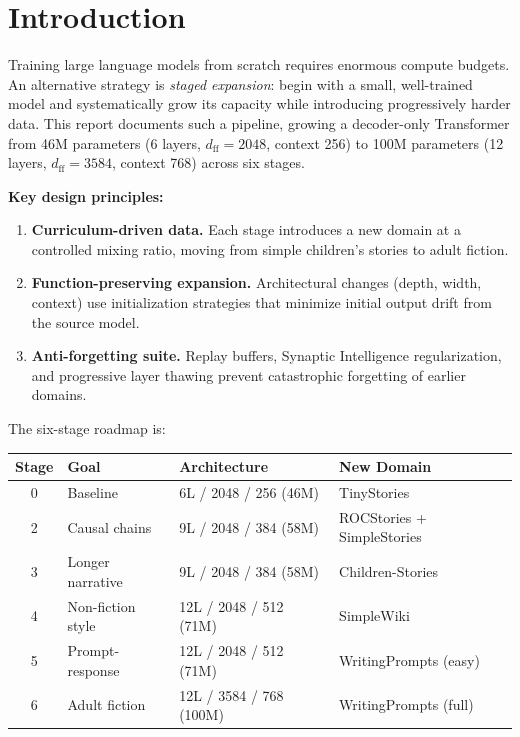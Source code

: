 \section{Introduction}

Training large language models from scratch requires enormous compute budgets.
An alternative strategy is \emph{staged expansion}: begin with a small,
well-trained model and systematically grow its capacity while introducing
progressively harder data.  This report documents such a pipeline, growing a
decoder-only Transformer from 46M parameters (6 layers, $d_\text{ff}=2048$,
context 256) to 100M parameters (12 layers, $d_\text{ff}=3584$, context 768)
across six stages.

\textbf{Key design principles:}
\begin{enumerate}[nosep]
  \item \textbf{Curriculum-driven data.}  Each stage introduces a new domain
        at a controlled mixing ratio, moving from simple children's stories to
        adult fiction.
  \item \textbf{Function-preserving expansion.}  Architectural changes
        (depth, width, context) use initialization strategies that minimize
        initial output drift from the source model.
  \item \textbf{Anti-forgetting suite.}  Replay buffers, Synaptic Intelligence
        regularization, and progressive layer thawing prevent catastrophic
        forgetting of earlier domains.
\end{enumerate}

The six-stage roadmap is:
\begin{center}
\small
\begin{tabular}{clll}
\toprule
\textbf{Stage} & \textbf{Goal} & \textbf{Architecture} & \textbf{New Domain} \\
\midrule
0 & Baseline          & 6L / 2048 / 256 (46M)   & TinyStories \\
2 & Causal chains     & 9L / 2048 / 384 (58M)   & ROCStories + SimpleStories \\
3 & Longer narrative  & 9L / 2048 / 384 (58M)   & Children-Stories \\
4 & Non-fiction style & 12L / 2048 / 512 (71M)  & SimpleWiki \\
5 & Prompt-response   & 12L / 2048 / 512 (71M)  & WritingPrompts (easy) \\
6 & Adult fiction     & 12L / 3584 / 768 (100M) & WritingPrompts (full) \\
\bottomrule
\end{tabular}
\end{center}
